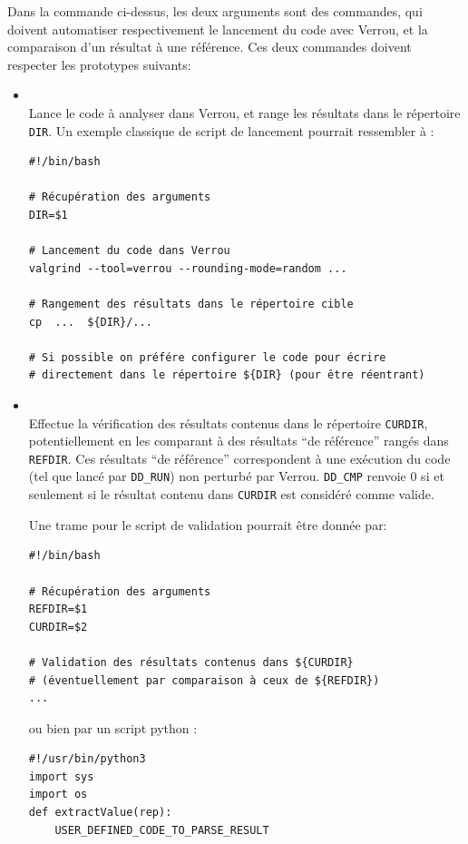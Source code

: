 \documentclass[a4paper]{article}
\def\mdfilename{File}
\newenvironment{file}[1][Fichier]{
  \def\mdfilename{#1}
  \begin{mdframed}[style=file]
}{
  \end{mdframed}
}
\begin{document}
Dans la commande ci-dessus, les deux arguments sont des commandes, qui doivent
automatiser respectivement le lancement du code avec Verrou, et la comparaison
d'un résultat à une référence. Ces deux commandes doivent respecter les
prototypes suivants: \medskip
\begin{itemize}
\item[\tt DD\_RUN DIR]\strut\\
  Lance le code à analyser dans Verrou, et range les résultats dans le
  répertoire \texttt{DIR}. Un exemple classique de script de lancement pourrait
  ressembler à :

\begin{file}[ddRun]
\begin{verbatim}
#!/bin/bash

# Récupération des arguments
DIR=$1

# Lancement du code dans Verrou
valgrind --tool=verrou --rounding-mode=random ...

# Rangement des résultats dans le répertoire cible
cp  ...  ${DIR}/...

# Si possible on préfére configurer le code pour écrire
# directement dans le répertoire ${DIR} (pour être réentrant)

\end{verbatim}
\end{file}

  \medskip
\item[\tt DD\_CMP REFDIR CURDIR]\strut\\
  Effectue la vérification des résultats contenus dans le répertoire
  \texttt{CURDIR}, potentiellement en les comparant à des résultats ``de
  référence'' rangés dans \texttt{REFDIR}. Ces résultats ``de référence''
  correspondent à une exécution du code (tel que lancé par \texttt{DD\_RUN}) non
  perturbé par Verrou. \texttt{DD\_CMP} renvoie 0 si et seulement si le résultat
  contenu dans \texttt{CURDIR} est considéré comme valide.

  Une trame pour le script de validation pourrait être donnée par:
\begin{file}[ddCmp]
\begin{verbatim}
#!/bin/bash

# Récupération des arguments
REFDIR=$1
CURDIR=$2

# Validation des résultats contenus dans ${CURDIR}
# (éventuellement par comparaison à ceux de ${REFDIR})
...
\end{verbatim}
\end{file}
ou bien par un script python :
\begin{file}[ddCmp.py]
\begin{verbatim}
#!/usr/bin/python3
import sys
import os
def extractValue(rep):
    USER_DEFINED_CODE_TO_PARSE_RESULT


\end{verbatim}
\end{file}
\end{itemize}
\end{document}
